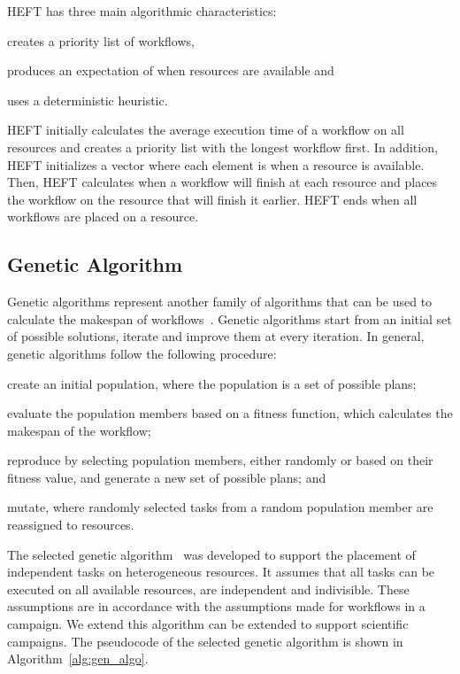 HEFT has three main algorithmic characteristics:
\begin{inparaenum}[1)]
    \item creates a priority list of workflows,
    \item produces an expectation of when resources are available and
    \item uses a deterministic heuristic.
\end{inparaenum}
HEFT initially calculates the average execution time of a workflow on all 
resources and creates a priority list with the longest workflow first. In 
addition, HEFT initializes a vector where each element is when a resource is 
available. Then, HEFT calculates when a workflow will finish at each resource 
and places the workflow on the resource that will finish it earlier. HEFT ends 
when all workflows are placed on a resource.

   
\subsection{Genetic Algorithm}
\label{algo:gen}
Genetic algorithms represent another family of algorithms that can be  used to 
calculate the makespan of workflows~\cite{dong2006scheduling}. Genetic 
algorithms start from an initial set of possible solutions, iterate and 
improve them at every iteration. In general, genetic algorithms follow the 
following procedure:
\begin{inparaenum}[(i)]
    \item create an initial population, where the population is a set of 
    possible plans;
    \item evaluate the population members based on a fitness function, which 
    calculates the makespan of the workflow;
    \item reproduce by selecting population members, either randomly or based 
    on their fitness value, and generate a new set of possible plans; and
    \item mutate, where randomly selected tasks from a random population 
    member are reassigned to resources.
\end{inparaenum}

The selected genetic algorithm~\cite{page2005algorithm} was developed to 
support the placement of independent tasks on heterogeneous resources. It 
assumes that all tasks can be executed on all available resources, are 
independent and indivisible. These assumptions are in accordance with the 
assumptions made for workflows in a campaign. We extend this algorithm can be 
extended to support scientific campaigns. The pseudocode of the selected 
genetic algorithm is shown in Algorithm~\ref{alg:gen_algo}.

